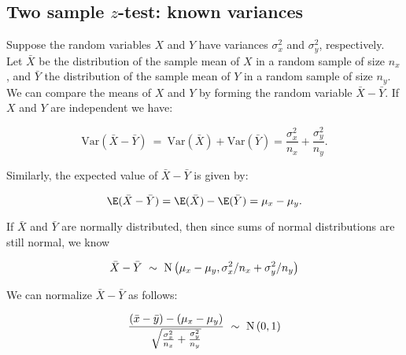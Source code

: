 

\subsection{Two sample $z$-test: known variances}



Suppose the random variables $X$ and $Y$ have variances $\sigma^2_x$ and $\sigma^2_y$, respectively.  Let $\bar{X}$ be the distribution of the sample mean of $X$ in a random sample of size $n_x$, and $\bar{Y}$ the distribution of the sample mean of $Y$ in a random sample of size $n_y$.  We can compare the means of $X$ and $Y$ by forming the random variable $\bar{X} - \bar{Y}$.  If $X$ and $Y$ are independent we have:



\begin{equation*}

\textrm{Var}(\bar{X} - \bar{Y})\ =\ \textrm{Var}(\bar{X}) + \textrm{Var}(\bar{Y}) = \frac{\sigma^2_x}{n_x} + \frac{\sigma^2_y}{n_y}.

\end{equation*}

Similarly, the expected value of $\bar{X} - \bar{Y}$ is given by:



\begin{equation*}

\E(\bar{X} - \bar{Y}) = \E(\bar{X}) - \E(\bar{Y}) = \mu_x - \mu_y.

\end{equation*}

If $\bar{X}$ and $\bar{Y}$ are normally distributed, then since sums of normal distributions are still normal, we know



\begin{equation*}

\bar{X} - \bar{Y}\ \sim\  {\rm N}\left(\mu_x - \mu_y, \sigma^2_x/n_x + \sigma^2_y/n_y\right)

\end{equation*}

We can normalize $\bar{X}-\bar{Y}$ as follows:



\begin{equation} \label{eq:twosampledistribution}

\frac{\left(\bar{x} - \bar{y}\right) - \left(\mu_x - \mu_y \right)}{\sqrt{\frac{\sigma^2_x}{n_x} + \frac{\sigma^2_y}{n_y}}} \ \sim \  {\rm N}\left(0,1\right)

\end{equation}

